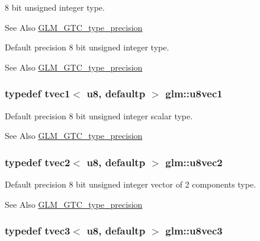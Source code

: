 8 bit unsigned integer type. \begin{DoxySeeAlso}{See Also}
\hyperlink{group__gtc__type__precision}{G\-L\-M\-\_\-\-G\-T\-C\-\_\-type\-\_\-precision}
\end{DoxySeeAlso}
Default precision 8 bit unsigned integer type. \begin{DoxySeeAlso}{See Also}
\hyperlink{group__gtc__type__precision}{G\-L\-M\-\_\-\-G\-T\-C\-\_\-type\-\_\-precision} 
\end{DoxySeeAlso}
\hypertarget{group__gtc__type__precision_ga024be724ff45865952190522b03fc0d5}{
\subsubsection[{u8vec1}]{\setlength{\rightskip}{0pt plus 5cm}typedef tvec1$<$ u8, defaultp $>$ {\bf glm\-::u8vec1}}}\label{group__gtc__type__precision_ga024be724ff45865952190522b03fc0d5}
Default precision 8 bit unsigned integer scalar type. \begin{DoxySeeAlso}{See Also}
\hyperlink{group__gtc__type__precision}{G\-L\-M\-\_\-\-G\-T\-C\-\_\-type\-\_\-precision} 
\end{DoxySeeAlso}
\hypertarget{group__gtc__type__precision_ga1c259b876f8757eb197b83a5fab476f0}{
\subsubsection[{u8vec2}]{\setlength{\rightskip}{0pt plus 5cm}typedef tvec2$<$ u8, defaultp $>$ {\bf glm\-::u8vec2}}}\label{group__gtc__type__precision_ga1c259b876f8757eb197b83a5fab476f0}
Default precision 8 bit unsigned integer vector of 2 components type. \begin{DoxySeeAlso}{See Also}
\hyperlink{group__gtc__type__precision}{G\-L\-M\-\_\-\-G\-T\-C\-\_\-type\-\_\-precision} 
\end{DoxySeeAlso}
\hypertarget{group__gtc__type__precision_ga8262aeb120701de1b57773eb10be0f35}{
\subsubsection[{u8vec3}]{\setlength{\rightskip}{0pt plus 5cm}typedef tvec3$<$ u8, defaultp $>$ {\bf glm\-::u8vec3}}}\label{group__gtc__type__precision_ga8262aeb120701de1b57773eb10be0f35}
